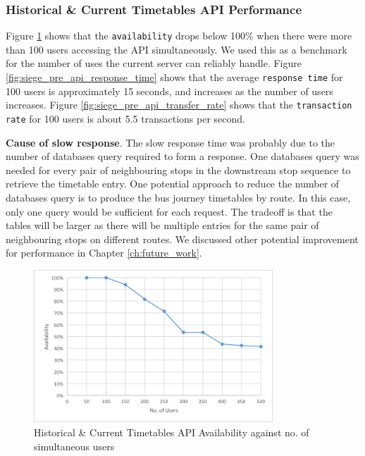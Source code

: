 \subsubsection{Historical \& Current Timetables API Performance}

\par Figure \ref{fig:siege_pre_api_availability} shows that the \texttt{availability} drops below 100\% when there were more than 100 users accessing the API simultaneously. We used this as a benchmark for the number of uses the current server can reliably handle. Figure \ref{fig:siege_pre_api_response_time} shows that the average \texttt{response time} for 100 users is approximately 15 seconds, and increases as the number of users increases. Figure \ref{fig:siege_pre_api_transfer_rate} shows that the \texttt{transaction rate} for 100 users is about 5.5 transactions per second.

\textbf{Cause of slow response}. The slow response time was probably due to the number of databases query required to form a response. One databases query was needed for every pair of neighbouring stops in the downstream stop sequence to retrieve the timetable entry. One potential approach to reduce the number of databases query is to produce the bus journey timetables by route. In this case, only one query would be sufficient for each request. The tradeoff is that the tables will be larger as there will be multiple entries for the same pair of neighbouring stops on different routes. We discussed other potential improvement for performance in Chapter \ref{ch:future_work}.

\begin{figure}
\centering
\includegraphics[width=0.8\textwidth]{figures/siege_predictions_api_availability_against_users.pdf}
\caption{\label{fig:siege_pre_api_availability} Historical \& Current Timetables API Availability against no. of simultaneous users}
\end{figure}

